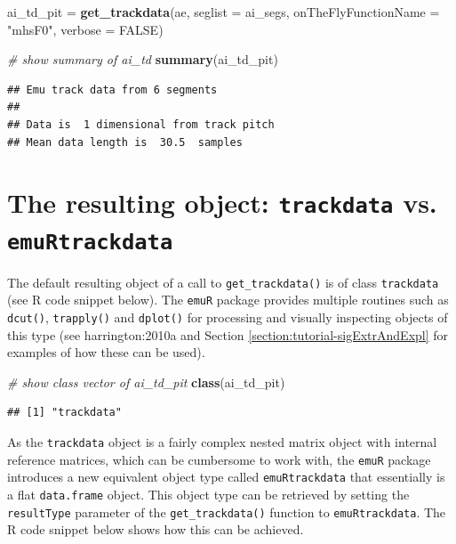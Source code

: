 \documentclass[]{book}
\newenvironment{Shaded}{\begin{snugshade}}{\end{snugshade}}
\newcommand{\CommentTok}[1]{\textcolor[rgb]{0.56,0.35,0.01}{\textit{#1}}}
\newcommand{\DataTypeTok}[1]{\textcolor[rgb]{0.13,0.29,0.53}{#1}}
\newcommand{\KeywordTok}[1]{\textcolor[rgb]{0.13,0.29,0.53}{\textbf{#1}}}
\newcommand{\NormalTok}[1]{#1}
\newcommand{\OtherTok}[1]{\textcolor[rgb]{0.56,0.35,0.01}{#1}}
\newcommand{\StringTok}[1]{\textcolor[rgb]{0.31,0.60,0.02}{#1}}
\theoremstyle{definition}
\theoremstyle{definition}
\theoremstyle{definition}
\theoremstyle{remark}
\begin{document}
\begin{Shaded}
\begin{Highlighting}[]
\NormalTok{ai_td_pit =}\StringTok{ }\KeywordTok{get_trackdata}\NormalTok{(ae,}
                          \DataTypeTok{seglist =}\NormalTok{ ai_segs,}
                          \DataTypeTok{onTheFlyFunctionName =} \StringTok{"mhsF0"}\NormalTok{,}
                          \DataTypeTok{verbose =} \OtherTok{FALSE}\NormalTok{)}

\CommentTok{# show summary of ai_td}
\KeywordTok{summary}\NormalTok{(ai_td_pit)}
\end{Highlighting}
\end{Shaded}

\begin{verbatim}
## Emu track data from 6 segments
## 
## Data is  1 dimensional from track pitch 
## Mean data length is  30.5  samples
\end{verbatim}

\hypertarget{the-resulting-object-trackdata-vs.-emurtrackdata}{%
\section{\texorpdfstring{The resulting object: \texttt{trackdata} vs.
\texttt{emuRtrackdata}}{The resulting object: trackdata vs. emuRtrackdata}}\label{the-resulting-object-trackdata-vs.-emurtrackdata}}

The default resulting object of a call to \texttt{get\_trackdata()} is
of class \texttt{trackdata} (see R code snippet below). The
\texttt{emuR} package provides multiple routines such as
\texttt{dcut()}, \texttt{trapply()} and \texttt{dplot()} for processing
and visually inspecting objects of this type (see harrington:2010a and
Section \ref{section:tutorial-sigExtrAndExpl} for examples of how these
can be used).

\begin{Shaded}
\begin{Highlighting}[]
\CommentTok{# show class vector of ai_td_pit}
\KeywordTok{class}\NormalTok{(ai_td_pit)}
\end{Highlighting}
\end{Shaded}

\begin{verbatim}
## [1] "trackdata"
\end{verbatim}

As the \texttt{trackdata} object is a fairly complex nested matrix
object with internal reference matrices, which can be cumbersome to work
with, the \texttt{emuR} package introduces a new equivalent object type
called \texttt{emuRtrackdata} that essentially is a flat
\texttt{data.frame} object. This object type can be retrieved by setting
the \texttt{resultType} parameter of the \texttt{get\_trackdata()}
function to \texttt{emuRtrackdata}. The R code snippet below shows how
this can be achieved.
\end{document}
